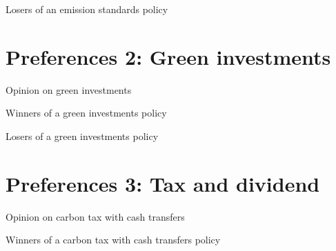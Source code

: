 \documentclass{article}
\begin{document}
\begin{table}[h!]
	\caption{Losers of an emission standards policy}
	\begin{center}
		\scalebox{0.7}{}
	\end{center}
\end{table}	

\section{Preferences 2: Green investments}

\begin{table}[h!]
	\caption{Opinion on green investments}
	\begin{center}
		\scalebox{0.7}{}
	\end{center}
\end{table}	

\begin{table}[h!]
	\caption{Winners of a green investments policy}
	\begin{center}
		\scalebox{0.7}{}
	\end{center}
\end{table}	

\begin{table}[h!]
	\caption{Losers of a green investments policy}
	\begin{center}
		\scalebox{0.7}{}
	\end{center}
\end{table}	

\section{Preferences 3: Tax and dividend}

\begin{table}[h!]
	\caption{Opinion on carbon tax with cash transfers}
	\begin{center}
		\scalebox{0.7}{}
	\end{center}
\end{table}	

\begin{table}[h!]
	\caption{Winners of a carbon tax with cash transfers policy}
	\begin{center}
		\scalebox{0.7}{}
	\end{center}
\end{table}	
\end{document}
